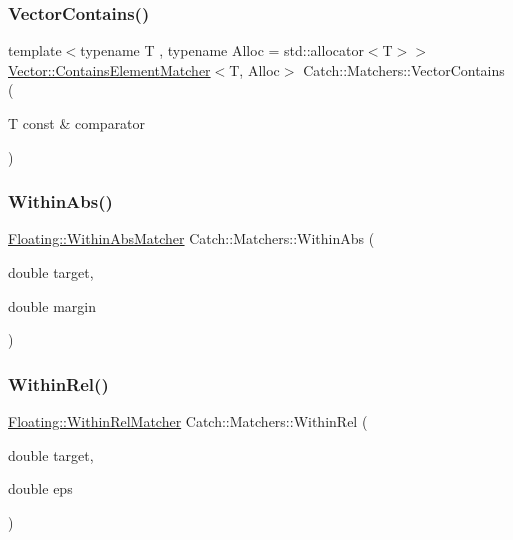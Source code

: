 \subsubsection{\texorpdfstring{Vector\+Contains()}{VectorContains()}}
{\footnotesize\ttfamily template$<$typename T , typename Alloc  = std\+::allocator$<$\+T$>$$>$ \\
\mbox{\hyperlink{struct_catch_1_1_matchers_1_1_vector_1_1_contains_element_matcher}{Vector\+::\+Contains\+Element\+Matcher}}$<$T, Alloc$>$ Catch\+::\+Matchers\+::\+Vector\+Contains (\begin{DoxyParamCaption}\item[{T const \&}]{comparator }\end{DoxyParamCaption})}

\mbox{\label{namespace_catch_1_1_matchers_a4c9ea76d47d02de0cf2d354c87c26e95}} 
\subsubsection{\texorpdfstring{Within\+Abs()}{WithinAbs()}}
{\footnotesize\ttfamily \mbox{\hyperlink{struct_catch_1_1_matchers_1_1_floating_1_1_within_abs_matcher}{Floating\+::\+Within\+Abs\+Matcher}} Catch\+::\+Matchers\+::\+Within\+Abs (\begin{DoxyParamCaption}\item[{double}]{target,  }\item[{double}]{margin }\end{DoxyParamCaption})}

\mbox{\label{namespace_catch_1_1_matchers_a0c559d9cfda02a81941ad6933f4ca450}} 
\subsubsection{\texorpdfstring{Within\+Rel()}{WithinRel()}\hspace{0.1cm}{\footnotesize\ttfamily [1/4]}}
{\footnotesize\ttfamily \mbox{\hyperlink{struct_catch_1_1_matchers_1_1_floating_1_1_within_rel_matcher}{Floating\+::\+Within\+Rel\+Matcher}} Catch\+::\+Matchers\+::\+Within\+Rel (\begin{DoxyParamCaption}\item[{double}]{target,  }\item[{double}]{eps }\end{DoxyParamCaption})}

